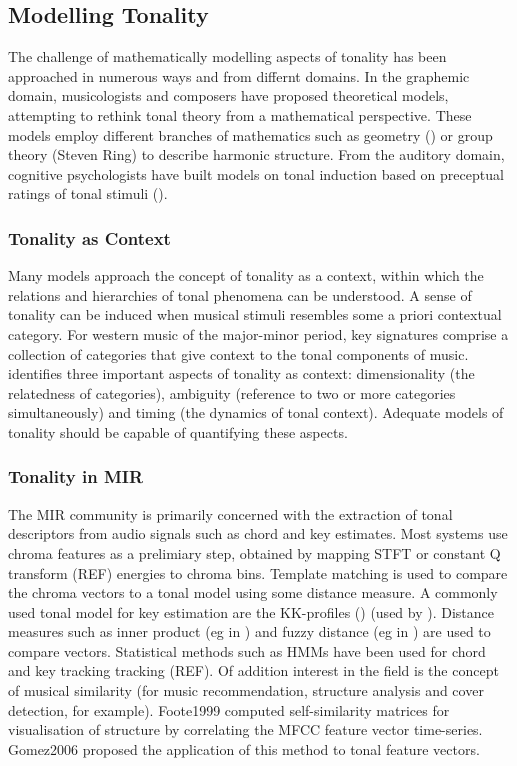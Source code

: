 \documentclass{article}
\begin{document}
\subsection{Modelling Tonality}
\label{sec-2-2}

The challenge of mathematically modelling aspects of tonality has been
approached in numerous ways and from differnt domains. In the
graphemic domain, musicologists and composers have proposed
theoretical models, attempting to rethink tonal theory from a
mathematical perspective. These models employ different branches of
mathematics such as geometry (\citep{Tymoczko2012}) or group theory
(Steven Ring) to describe harmonic structure. From the auditory
domain, cognitive psychologists have built models on tonal induction
based on preceptual ratings of tonal stimuli (\citep{Krumhansl1990}).
\subsubsection{Tonality as Context}
\label{sec-2-2-1}

Many models approach the concept of tonality as a context, within
which the relations and hierarchies of tonal phenomena can be
understood. A sense of tonality can be induced when musical stimuli
resembles some a priori contextual category. For western music of the
major-minor period, key signatures comprise a collection of categories
that give context to the tonal components of
music. \citep{Martorel2013} identifies three important aspects of
tonality as context: dimensionality (the relatedness of categories),
ambiguity (reference to two or more categories simultaneously) and
timing (the dynamics of tonal context). Adequate models of tonality
should be capable of quantifying these aspects.
\subsubsection{Tonality in MIR}
\label{sec-2-2-2}

The MIR community is primarily concerned with the extraction of tonal
descriptors from audio signals such as chord and key estimates. Most
systems use chroma features as a prelimiary step, obtained by mapping
STFT or constant Q transform (REF) energies to chroma bins. Template
matching is used to compare the chroma vectors to a tonal model using
some distance measure. A commonly used tonal model for key estimation
are the KK-profiles (\citep{Krumhansl1990}) (used by ). Distance
measures such as inner product (eg in ) and fuzzy distance (eg in )
are used to compare vectors. Statistical methods such as HMMs have
been used for chord and key tracking tracking (REF). Of addition
interest in the field is the concept of musical similarity (for music
recommendation, structure analysis and cover detection, for
example). Foote1999 computed self-similarity matrices for
visualisation of structure by correlating the MFCC feature vector
time-series. Gomez2006 proposed the application of this method to
tonal feature vectors.
\end{document}
